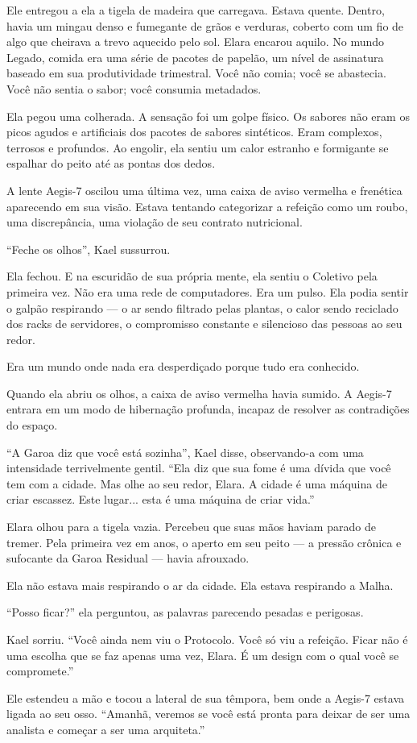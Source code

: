 Ele entregou a ela a tigela de madeira que carregava. Estava quente. Dentro, havia um mingau denso e fumegante de grãos e verduras, coberto com um fio de algo que cheirava a trevo aquecido pelo sol. Elara encarou aquilo. No mundo Legado, comida era uma série de pacotes de papelão, um nível de assinatura baseado em sua produtividade trimestral. Você não comia; você se abastecia. Você não sentia o sabor; você consumia metadados.

Ela pegou uma colherada. A sensação foi um golpe físico. Os sabores não eram os picos agudos e artificiais dos pacotes de sabores sintéticos. Eram complexos, terrosos e profundos. Ao engolir, ela sentiu um calor estranho e formigante se espalhar do peito até as pontas dos dedos.


A lente Aegis-7 oscilou uma última vez, uma caixa de aviso vermelha e frenética aparecendo em sua visão. Estava tentando categorizar a refeição como um roubo, uma discrepância, uma violação de seu contrato nutricional.

``Feche os olhos'', Kael sussurrou.

Ela fechou. E na escuridão de sua própria mente, ela sentiu o Coletivo pela primeira vez. Não era uma rede de computadores. Era um pulso. Ela podia sentir o galpão respirando --- o ar sendo filtrado pelas plantas, o calor sendo reciclado dos racks de servidores, o compromisso constante e silencioso das pessoas ao seu redor.

Era um mundo onde nada era desperdiçado porque tudo era conhecido.

Quando ela abriu os olhos, a caixa de aviso vermelha havia sumido. A Aegis-7 entrara em um modo de hibernação profunda, incapaz de resolver as contradições do espaço.

``A Garoa diz que você está sozinha'', Kael disse, observando-a com uma intensidade terrivelmente gentil. ``Ela diz que sua fome é uma dívida que você tem com a cidade. Mas olhe ao seu redor, Elara. A cidade é uma máquina de criar escassez. Este lugar... esta é uma máquina de criar vida.''

Elara olhou para a tigela vazia. Percebeu que suas mãos haviam parado de tremer. Pela primeira vez em anos, o aperto em seu peito --- a pressão crônica e sufocante da Garoa Residual --- havia afrouxado.

Ela não estava mais respirando o ar da cidade. Ela estava respirando a Malha.

``Posso ficar?'' ela perguntou, as palavras parecendo pesadas e perigosas.

Kael sorriu. ``Você ainda nem viu o Protocolo. Você só viu a refeição. Ficar não é uma escolha que se faz apenas uma vez, Elara. É um design com o qual você se compromete.''

Ele estendeu a mão e tocou a lateral de sua têmpora, bem onde a Aegis-7 estava ligada ao seu osso. ``Amanhã, veremos se você está pronta para deixar de ser uma analista e começar a ser uma arquiteta.''
